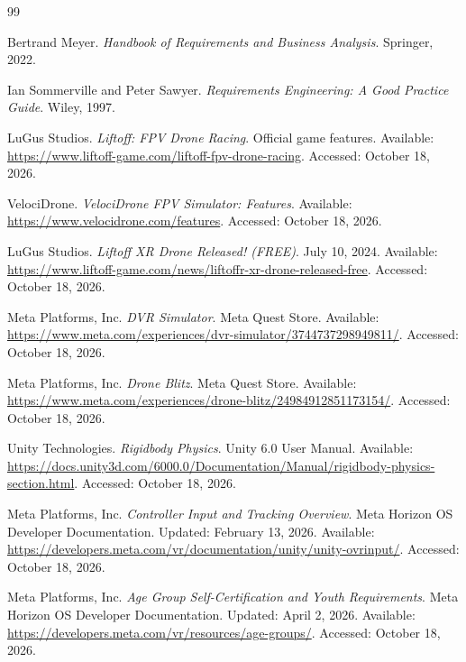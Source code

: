 \documentclass[12pt]{article}
\begin{document}
\clearpage



\begin{thebibliography}{99}


Bertrand Meyer.
\textit{Handbook of Requirements and Business Analysis}.
Springer, 2022.

Ian Sommerville and Peter Sawyer.
\textit{Requirements Engineering: A Good Practice Guide}.
Wiley, 1997.



LuGus Studios.
\textit{Liftoff: FPV Drone Racing}.
Official game features.
Available: \url{https://www.liftoff-game.com/liftoff-fpv-drone-racing}.
Accessed: October 18, 2026.

VelociDrone.
\textit{VelociDrone FPV Simulator: Features}.
Available: \url{https://www.velocidrone.com/features}.
Accessed: October 18, 2026.

LuGus Studios.
\textit{Liftoff XR Drone Released! (FREE)}.
July 10, 2024.
Available: \url{https://www.liftoff-game.com/news/liftoffr-xr-drone-released-free}.
Accessed: October 18, 2026.

Meta Platforms, Inc.
\textit{DVR Simulator}.
Meta Quest Store.
Available: \url{https://www.meta.com/experiences/dvr-simulator/3744737298949811/}.
Accessed: October 18, 2026.

Meta Platforms, Inc.
\textit{Drone Blitz}.
Meta Quest Store.
Available: \url{https://www.meta.com/experiences/drone-blitz/24984912851173154/}.
Accessed: October 18, 2026.



Unity Technologies.
\textit{Rigidbody Physics}.
Unity 6.0 User Manual.
Available: \url{https://docs.unity3d.com/6000.0/Documentation/Manual/rigidbody-physics-section.html}.
Accessed: October 18, 2026.

Meta Platforms, Inc.
\textit{Controller Input and Tracking Overview}.
Meta Horizon OS Developer Documentation.
Updated: February 13, 2026.
Available: \url{https://developers.meta.com/vr/documentation/unity/unity-ovrinput/}.
Accessed: October 18, 2026.

Meta Platforms, Inc.
\textit{Age Group Self-Certification and Youth Requirements}.
Meta Horizon OS Developer Documentation.
Updated: April 2, 2026.
Available: \url{https://developers.meta.com/vr/resources/age-groups/}.
Accessed: October 18, 2026.

\end{thebibliography}
\end{document}
